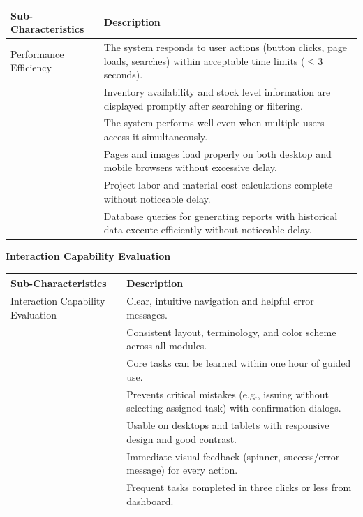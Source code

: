 \documentclass[12pt, letterpaper]{article}
\begin{document}
\begin{tabular}{p{4.3cm} p{7.5cm}}
\toprule
\textbf{Sub-Characteristics} & \textbf{Description} \\
\midrule
Performance Efficiency &The system responds to user actions (button clicks, page loads, searches) within acceptable time limits ($\le 3$ seconds).\\
&Inventory availability and stock level information are displayed promptly after searching or filtering.\\
&The system performs well even when multiple users access it simultaneously.\\
&Pages and images load properly on both desktop and mobile browsers without excessive delay.\\
&Project labor and material cost calculations complete without noticeable delay.\\
&Database queries for generating reports with historical data execute efficiently without noticeable delay.\\
\bottomrule
\end{tabular}


\newpage 

\begin{center}\textbf{Interaction Capability Evaluation}\end{center}
\centering

\begin{tabular}{p{4.3cm} p{7.5cm}}
\toprule
\textbf{Sub-Characteristics} & \textbf{Description} \\
\midrule
Interaction Capability Evaluation &Clear, intuitive navigation and helpful error messages.\\
&Consistent layout, terminology, and color scheme across all modules.\\
&Core tasks can be learned within one hour of guided use.\\
&Prevents critical mistakes (e.g., issuing without selecting assigned task) with confirmation dialogs.\\
&Usable on desktops and tablets with responsive design and good contrast.\\
&Immediate visual feedback (spinner, success/error message) for every action.\\
&Frequent tasks completed in three clicks or less from dashboard.\\
\bottomrule
\end{tabular}

\clearpage

\end{document}
